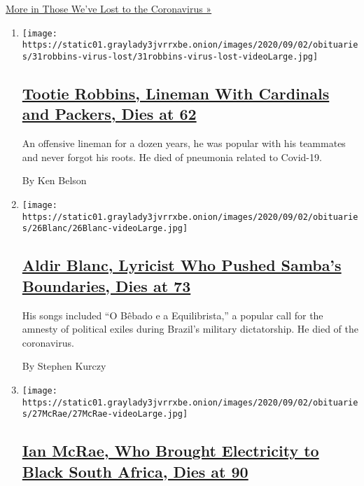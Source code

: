\href{/series/people-died-coronavirus-obituaries}{More in Those We've
Lost to the Coronavirus »}

\begin{enumerate}
\def\labelenumi{\arabic{enumi}.}
\item
  \texttt{[image: https://static01.graylady3jvrrxbe.onion/images/2020/09/02/obituaries/31robbins-virus-lost/31robbins-virus-lost-videoLarge.jpg]}

  \hypertarget{tootie-robbins-lineman-with-cardinals-and-packers-dies-at-62}{%
  \subsection{\texorpdfstring{\href{/2020/09/01/obituaries/james-robbins-dead-coronavirus.html}{Tootie
  Robbins, Lineman With Cardinals and Packers, Dies at
  62}}{Tootie Robbins, Lineman With Cardinals and Packers, Dies at 62}}\label{tootie-robbins-lineman-with-cardinals-and-packers-dies-at-62}}

  An offensive lineman for a dozen years, he was popular with his
  teammates and never forgot his roots. He died of pneumonia related to
  Covid-19.

  By Ken Belson
\item
  \texttt{[image: https://static01.graylady3jvrrxbe.onion/images/2020/09/02/obituaries/26Blanc/26Blanc-videoLarge.jpg]}

  \hypertarget{aldir-blanc-lyricist-who-pushed-sambas-boundaries-dies-at-73}{%
  \subsection{\texorpdfstring{\href{/2020/08/31/obituaries/aldir-blanc-mendes-dead.html}{Aldir
  Blanc, Lyricist Who Pushed Samba's Boundaries, Dies at
  73}}{Aldir Blanc, Lyricist Who Pushed Samba's Boundaries, Dies at 73}}\label{aldir-blanc-lyricist-who-pushed-sambas-boundaries-dies-at-73}}

  His songs included ``O Bêbado e a Equilibrista,'' a popular call for
  the amnesty of political exiles during Brazil's military dictatorship.
  He died of the coronavirus.

  By Stephen Kurczy
\item
  \texttt{[image: https://static01.graylady3jvrrxbe.onion/images/2020/09/02/obituaries/27McRae/27McRae-videoLarge.jpg]}

  \hypertarget{ian-mcrae-who-brought-electricity-to-black-south-africa-dies-at-90}{%
  \subsection{\texorpdfstring{\href{/2020/08/28/obituaries/ian-mcrae-dead-coronavirus.html}{Ian
  McRae, Who Brought Electricity to Black South Africa, Dies at
  90}}{Ian McRae, Who Brought Electricity to Black South Africa, Dies at 90}}\label{ian-mcrae-who-brought-electricity-to-black-south-africa-dies-at-90}}


\end{enumerate}
